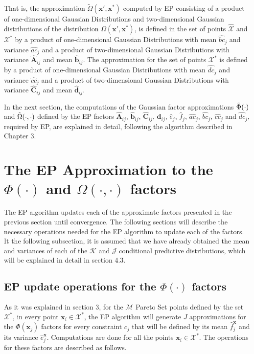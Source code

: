 That is, the approximation $\tilde{\Omega}(\boldsymbol{x}',\boldsymbol{x}^*)$ computed by EP consisting of a product of one-dimensional Gaussian Distributions and two-dimensional Gaussian distributions of the distribution $\Omega(\boldsymbol{x}',\boldsymbol{x}^*)$, is defined in the set of points $\hat{\mathcal{X}}$ and $\mathcal{X}^*$ by a product of one-dimensional Gaussian Distributions with mean $\hat{bc}_j$ and variance $\hat{ac}_j$ and a product of two-dimensional Gaussian Distributions with variance $\hat{\boldsymbol{A}}_{ij}$ and mean $\hat{\boldsymbol{b}}_{ij}$. The approximation for the set of points $\mathcal{X}^*$ is defined by a product of one-dimensional Gaussian Distributions with mean $\hat{dc}_j$ and variance $\hat{cc}_j$ and a product of two-dimensional Gaussian Distributions with variance $\hat{\boldsymbol{C}}_{ij}$ and mean $\hat{\boldsymbol{d}}_{ij}$.

In the next section, the computations of the Gaussian factor approximations $\Tilde{\Phi}(\cdot)$ and $\Tilde{\Omega}(\cdot,\cdot)$ defined by the EP factors $\hat{\boldsymbol{A}}_{ij}$, $\hat{\boldsymbol{b}}_{ij}$, $\hat{\boldsymbol{C}}_{ij}$, $\hat{\boldsymbol{d}}_{ij}$, $\hat{e}_{j}$, $\hat{f}_{j}$, $\hat{ac}_j$, $\hat{bc}_j$, $\hat{cc}_j$ and $\hat{dc}_j$, required by EP, are explained in detail, following the algorithm described in Chapter 3.

\section{The EP Approximation to the $\Phi(\cdot)$ and $\Omega(\cdot,\cdot)$ factors}

The EP algorithm updates each of the approximate factors presented in the previous section until convergence. The following sections will describe the necessary operations needed for the EP algorithm to update each of the factors. It the following subsection, it is assumed that we have already obtained the mean and variances of each of the $\mathcal{K}$ and $\mathcal{J}$ conditional predictive distributions, which will be explained in detail in section 4.3.

\subsection{EP update operations for the $\Phi(\cdot)$ factors}

As it was explained in section 3, for the $\mathcal{M}$ Pareto Set points defined by the set $\mathcal{X}^*$, in every point $\boldsymbol{x}_i \in \mathcal{X}^*$, the EP algorithm will generate $J$ approximations for the $\Phi(\boldsymbol{x}_j)$ factors for every constraint $c_j$ that will be defined by its mean $\hat{f}_{j}^{\boldsymbol{x}}$ and its variance $\hat{e}_{j}^{\boldsymbol{x}}$. Computations are done for all the points $\boldsymbol{x}_i \in \mathcal{X}^*$. The operations for these factors are described as follows.

